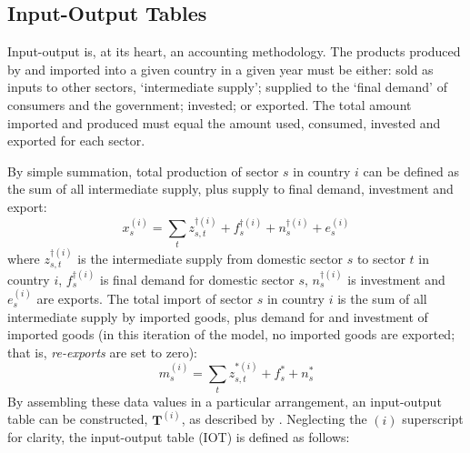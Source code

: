 \documentclass[a4paper]{article}
\begin{document}
\subsection{Input-Output Tables} \label{sec:iots}
Input-output is, at its heart, an accounting methodology.
The products produced by and imported into a given country in a given year must be either: sold as inputs to other sectors, `intermediate supply'; supplied to the `final demand' of consumers and the government; invested; or exported.
The total amount imported and produced must equal the amount used, consumed, invested and exported for each sector.

By simple summation, total production of sector $s$ in country $i$ can be defined as the sum of all intermediate supply, plus supply to final demand, investment and export:
\begin{equation}\label{eqn:x}
x_s^{(i)}=\sum\limits_{t}z_{s,t}^{\dagger(i)} + f_s^{\dagger(i)} + n_s^{\dagger(i)} + e_s^{(i)}
\end{equation}
where $z_{s,t}^{\dagger(i)}$ is the intermediate supply from domestic sector $s$ to sector $t$ in country $i$, $f_s^{\dagger(i)}$ is final demand for domestic sector $s$, $n_s^{\dagger(i)}$ is investment and $e_s^{(i)}$ are exports.
The total import of sector $s$ in country $i$ is the sum of all intermediate supply by imported goods, plus demand for and investment of imported goods (in this iteration of the model, no imported goods are exported; that is, \textit{re-exports} are set to zero):
\begin{equation}\label{eqn:m}
m_s^{(i)}=\sum\limits_{t}z_{s,t}^{*(i)} + f_s^* + n_s^*
\end{equation}
By assembling these data values in a particular arrangement, an input-output table can be constructed, $\boldsymbol{T}^{(i)}$, as described by \textcite{Miller1985}.
Neglecting the $(i)$ superscript for clarity, the input-output table (IOT) is defined as follows:
\end{document}
